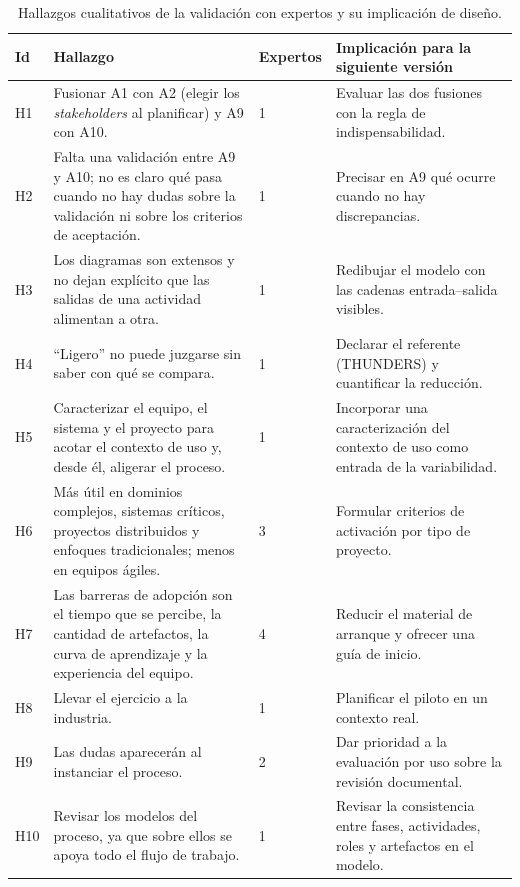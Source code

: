 \documentclass[12pt,letterpaper,oneside]{report}
\begin{document}
\begin{table}[H]
\caption{Hallazgos cualitativos de la validación con expertos y su implicación de diseño.}
\label{tab:hallazgos}
\centering
\footnotesize
\renewcommand{\arraystretch}{1.12}
\begin{tabularx}{\textwidth}{@{}L{0.8cm} Y L{1.7cm} Y@{}}
\toprule
\textbf{Id} & \textbf{Hallazgo} & \textbf{Expertos} & \textbf{Implicación para la
siguiente versión} \\
\midrule
H1 & Fusionar A1 con A2 (elegir los \textit{stakeholders} al planificar) y A9
con A10. & 1 & Evaluar las dos fusiones con la regla de indispensabilidad. \\
H2 & Falta una validación entre A9 y A10; no es claro qué pasa cuando no hay
dudas sobre la validación ni sobre los criterios de aceptación. & 1 & Precisar en A9 qué
ocurre cuando no hay discrepancias. \\
H3 & Los diagramas son extensos y no dejan explícito que las salidas de una
actividad alimentan a otra. & 1 & Redibujar el modelo con las cadenas
entrada--salida visibles. \\
H4 & ``Ligero'' no puede juzgarse sin saber con qué se compara. & 1 & Declarar el
referente (THUNDERS) y cuantificar la reducción. \\
H5 & Caracterizar el equipo, el sistema y el proyecto para acotar el contexto
de uso y, desde él, aligerar el proceso. & 1 & Incorporar una caracterización del contexto de uso como
entrada de la variabilidad. \\
H6 & Más útil en dominios complejos, sistemas críticos, proyectos distribuidos y
enfoques tradicionales; menos en equipos ágiles. & 3 & Formular criterios de
activación por tipo de proyecto. \\
H7 & Las barreras de adopción son el tiempo que se percibe, la cantidad de
artefactos, la curva de aprendizaje y la experiencia del equipo. & 4 & Reducir el material de arranque y ofrecer una guía
de inicio. \\
H8 & Llevar el ejercicio a la industria. & 1 & Planificar el piloto en un contexto
real. \\
H9 & Las dudas aparecerán al instanciar el proceso. & 2 & Dar prioridad a la
evaluación por uso sobre la revisión documental. \\
H10 & Revisar los modelos del proceso, ya que sobre ellos se apoya todo el flujo
de trabajo. & 1 & Revisar la consistencia entre fases, actividades, roles y
artefactos en el modelo. \\
\bottomrule
\end{tabularx}
\end{table}
\end{document}
